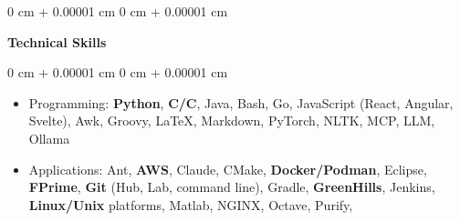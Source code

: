 \documentclass[10pt, letterpaper]{article}
\def\CC{{C\nolinebreak[4]\hspace{-.05em}\raisebox{.4ex}{\tiny\bf ++}}}
\newenvironment{highlightsforbulletentries}{
    \begin{itemize}[
        topsep=0.10 cm,
        parsep=0.10 cm,
        partopsep=0pt,
        itemsep=0pt,
        leftmargin=10pt
    ]
}{
    \end{itemize}
} %
\newenvironment{onecolentry}{
    \begin{adjustwidth}{
        0 cm + 0.00001 cm
    }{
        0 cm + 0.00001 cm
    }
}{
    \end{adjustwidth}
} %
\newenvironment{twocolentry}[2][]{
    \onecolentry
    \def\secondColumn{#2}
    \setcolumnwidth{\fill, 4.5 cm}
    \begin{paracol}{2}
}{
    \switchcolumn \raggedleft \secondColumn
    \end{paracol}
    \endonecolentry
} %
\begin{document}
    \begin{twocolentry}{
        }
            \textbf{\large Technical Skills}
    \end{twocolentry}
    \begin{onecolentry}
        \begin{highlightsforbulletentries}
            \item Programming: 
                                        \textbf{Python},
                                        \textbf{C/\CC},
                                        Java,
                                        Bash, 
                                        Go,
                                        JavaScript (React, Angular, Svelte),
                                        Awk,
                                        Groovy,
                                        \LaTeX{},
                                        Markdown,
                                        PyTorch, NLTK, MCP, LLM, Ollama
            \item Applications: 
                                        Ant, 
                                        \textbf{AWS}, 
                                        Claude,
                                        CMake, 
                                        \textbf{Docker/Podman}, 
                                        Eclipse, 
                                        \textbf{FPrime},
                                        \textbf{Git} (Hub, Lab, command line), 
                                        Gradle, 
                                        \textbf{GreenHills},
                                        Jenkins,
                                        \textbf{Linux/Unix} platforms, 
                                        Matlab, 
                                        NGINX,
                                        Octave, 
                                        Purify,

\end{highlightsforbulletentries}
\end{onecolentry}
\end{document}
